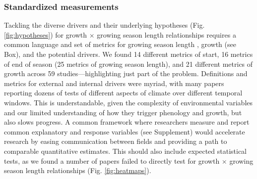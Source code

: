 \documentclass[11pt]{article}
\begin{document}
\subsubsection*{Standardized measurements} %

Tackling the diverse drivers and their underlying hypotheses (Fig. \ref{fig:hypotheses}) for growth $\times$ growing season length relationships requires a common language and set of metrics for growing season length \citep{korner2023four}, growth (see Box), and the potential drivers. We found 14 different metrics of start, 16 metrics of end of season (25 metrics of growing season length), and 21 different metrics of growth across 59 studies---highlighting just part of the problem. Definitions and metrics for external and internal drivers were myriad, %
with many papers reporting dozens of tests of different aspects of climate over different temporal windows. This is understandable, given the complexity of environmental variables and our limited understanding of how they trigger phenology and growth, but also slows progress. A common framework where researchers measure and report common explanatory and response variables (see Supplement) would accelerate research by easing communication between fields and providing a path to comparable quantitative estimates. This should also include expected statistical tests, as we found a number of papers failed to directly test for growth $\times$ growing season length relationships (Fig. \ref{fig:heatmaps}). %

\end{document}
